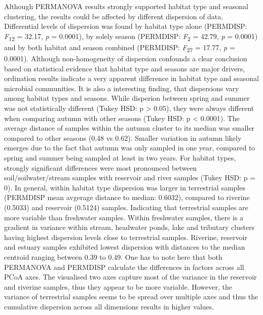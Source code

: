 \documentclass[12pt,a4paper]{article} %
\begin{document}
Although PERMANOVA results strongly supported habitat type and seasonal clustering, the results could be affected by different dispersion of data. Differential levels of dispersion was found by habitat type alone (PERMDISP: \textit{F}\textsubscript{12} = 32.17, \textit{p} = 0.0001), by solely season (PERMDISP: \textit{F}\textsubscript{2} = 42.79, \textit{p} = 0.0001) and by both habitat and season combined (PERMDISP: \textit{F}\textsubscript{27} = 17.77, \textit{p} = 0.0001). Although non-homogeneity of dispersion confounds a clear conclusion based on statistical evidence that habitat type and seasons are major drivers, ordination results indicate a very apparent difference in habitat type and seasonal microbial communities. It is also a interesting finding, that dispersions vary among habitat types and seasons. While disperion between spring and summer was not statistically different (Tukey HSD: p > 0.05), they were always different when comparing autumn with other seasons (Tukey HSD: p < 0.0001). The average distance of samples within the autumn cluster to its median was smaller compared to other seasons (0.48 vs 0.62). Smaller variation in autumn likely emerges due to the fact that autumn was only sampled in one year, compared to spring and summer being sampled at least in two years. For habitat types, strongly significant differences were most pronounced between soil/soilwater/stream samples with reservoir and river samples (Tukey HSD: p = 0). In general, within habitat type dispersion was larger in terrestrial samples (PERMDISP mean avgerage distance to median: 0.6032), compared to riverine (0.5033) and reservoir (0.5124) samples. Indicating that terrestrial samples are more variable than freshwater samples. Within freshwater samples, there is a gradient in variance within stream, headwater ponds, lake and tributary clusters having highest dispersion levels close to terrestrial samples. Riverine, reservoir and estuary samples exhibited lowest dispersion with distances to the median centroid ranging between 0.39 to 0.49. One has to note here that both PERMANOVA and PERMDISP calculate the differences in factors across all PCoA axes. The visualised two axes capture most of the variance in the reservoir and riverine samples, thus they appear to be more variable. However, the variance of terrestrial samples seems to be spread over multiple axes and thus the cumulative dispersion across all dimensions results in higher values.
\end{document}

